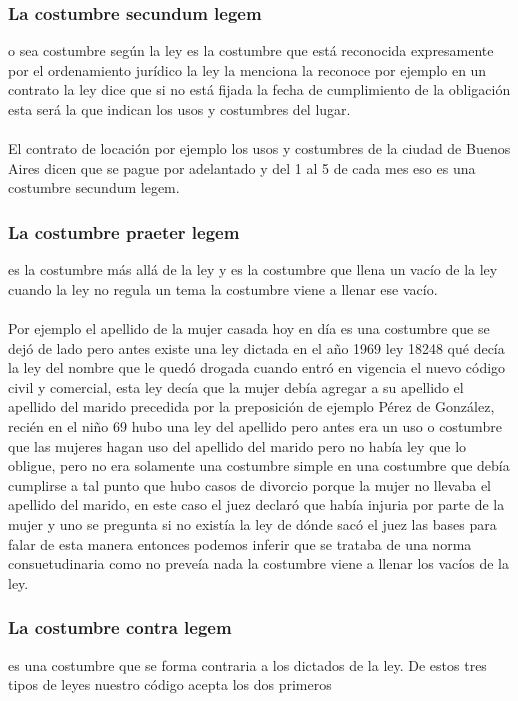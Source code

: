 \documentclass[12pt]{book}
\begin{document}
\subsubsection{La costumbre secundum legem} o sea costumbre según la ley es la costumbre que está reconocida expresamente por el ordenamiento jurídico la ley la menciona la reconoce
por ejemplo en un contrato la ley dice que si no está fijada la fecha de cumplimiento de la obligación esta será la que indican los usos y costumbres del lugar.
\\
\\
El contrato de locación por ejemplo los usos y costumbres de la ciudad de Buenos Aires dicen que se pague por adelantado y del 1 al 5 de cada mes eso es una costumbre secundum legem.

\subsubsection{La costumbre praeter legem }es la costumbre más allá de la ley y es la costumbre que llena un vacío de la ley cuando la ley no regula un tema la costumbre viene a llenar ese vacío.
\\
\\
Por ejemplo el apellido de la mujer casada hoy en día es una costumbre que se dejó de lado pero antes existe una ley dictada en el año 1969 ley 18248 qué decía la ley del nombre que le quedó drogada cuando entró en vigencia el nuevo código civil y comercial, esta ley decía que la mujer debía agregar a su apellido el apellido del marido precedida por la preposición de ejemplo Pérez de González, recién en el niño 69 hubo una ley del apellido pero antes era un uso o costumbre que las mujeres hagan uso del apellido del marido pero no había ley que lo obligue, pero no era solamente una costumbre simple en una costumbre que debía cumplirse a tal punto que hubo casos de divorcio porque la mujer no llevaba el apellido del marido, en este caso el juez declaró que había injuria por parte de la mujer y uno se pregunta si no existía la ley de dónde sacó el juez las bases para falar de esta manera entonces podemos inferir que se trataba de una norma consuetudinaria como no preveía nada la costumbre viene a llenar los vacíos de la ley.

\subsubsection{La costumbre contra legem} es una costumbre que se forma contraria a los dictados de la ley.
De estos tres tipos de leyes nuestro código acepta los dos primeros
\end{document}
